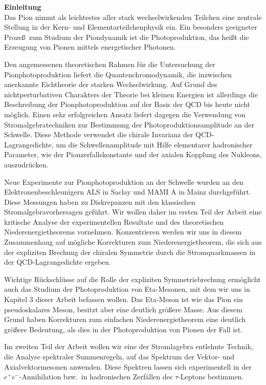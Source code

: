 \vspace*{4cm}
{\Huge \bf Einleitung} 
\\[3.5cm]
Das Pion nimmt als leichtestes aller stark wechselwirkenden Teilchen
eine zentrale Stellung in der Kern- und Elementarteilchenphysik ein.
Ein besonders geeigneter Proze\ss\ zum Studium der Piondynamik ist die
Photoproduktion, das hei\ss t die Erzeugung von Pionen mittels
energetischer Photonen.

Den angemessenen theoretischen Rahmen f\"ur die Untersuchung der
Pionphotoproduktion liefert die Quantenchromodynamik, die
inzwischen anerkannte Eichtheorie der starken Wechselwirkung.
Auf Grund des nichtperturbativen Charakters der Theorie bei kleinen
Energien ist allerdings die Beschreibung der Pionphotoproduktion 
auf der Basis der QCD  bis heute nicht m\"oglich. Einen 
sehr erfolgreichen Ansatz liefert dagegen die Verwendung von
Stromalgebratechniken zur Bestimmung der Photoproduktionsamplitude 
an der Schwelle. Diese Methode verwendet die chirale Invarianz 
der QCD-Lagrangedichte, um die Schwellenamplitude mit Hilfe 
elementarer hadronischer Parameter, wie der Pionzerfallskonstante
und der axialen Kopplung des Nukleons, auszudr\"ucken.     

Neue Experimente zur Pionphotoproduktion an der Schwelle wurden an
den Elektronenbeschleunigern ALS in Saclay und MAMI A in Mainz 
durchgef\"uhrt. Diese Messungen haben zu Diskrepanzen mit den 
klassischen Stromalgebravorhersagen gef\"uhrt. Wir wollen daher
im ersten Teil der Arbeit eine kritische Analyse der experimentellen
Resultate und des theoretischen Niederenergietheorems vornehmen.
Konzentrieren werden  wir uns in diesem Zusammenhang auf m\"ogliche 
Korrekturen zum Niederenergietheorem, die sich aus der expliziten 
Brechung der chiralen Symmetrie durch die Stromquarkmassen in der 
QCD-Lagrangedichte ergeben. \newpage

Wichtige R\"uckschl\"usse auf die Rolle der expliziten Symmetriebrechung
erm\"oglicht auch das Studium der Photoproduktion von Eta-Mesonen, mit
dem wir uns in Kapitel 3 dieser Arbeit befassen wollen.  Das
Eta-Meson ist wie das Pion ein pseudoskalares Meson, besitzt aber eine
deutlich gr\"o\ss ere Masse. Aus diesem Grund haben Korrekturen
zum einfachen Niederenergietheorem eine deutlich gr\"o\ss ere Bedeutung,
als dies in der Photoproduktion von Pionen der Fall ist.

Im zweiten Teil der Arbeit wollen wir eine der Stromlagebra entlehnte
Technik, die Analyse spektraler Summenregeln, auf das Spektrum der 
Vektor- und Axialvektormesonen anwenden. Diese Spektren lassen sich 
experimentell in der $e^+e^-$-Annihilation bzw.~in hadronischen 
Zerf\"allen des $\tau$-Leptons bestimmen. 

